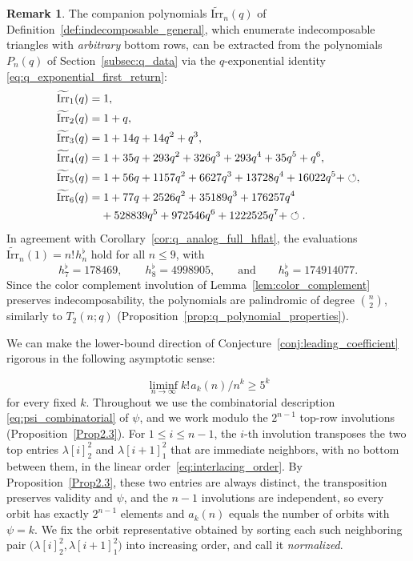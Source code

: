 \documentclass[10pt,a4paper]{amsart}
\numberwithin{equation}{section}
\newcommand{\ssp}{\hspace{1pt}}
\theoremstyle{definition}
\newtheorem{Remark}[Theorem]{Remark}
\begin{document}
\begin{Remark}
	The companion polynomials $\widetilde{\mathrm{Irr}}_n(q)$ of
	Definition~\ref{def:indecomposable_general}, which enumerate indecomposable
	triangles with \emph{arbitrary} bottom rows, can be extracted from the
	polynomials $P_n(q)$ of Section~\ref{subsec:q_data} via the $q$-exponential
	identity \eqref{eq:q_exponential_first_return}:
	\begin{align*}
		&\widetilde{\mathrm{Irr}}_1(q)=1,\\
		&\widetilde{\mathrm{Irr}}_2(q)=1+q,\\
		&\widetilde{\mathrm{Irr}}_3(q)=1+14q+14q^2+q^3,\\
		&\widetilde{\mathrm{Irr}}_4(q)=1+35q+293q^2+326q^3+293q^4
		+35q^5+q^6,\\
		&\widetilde{\mathrm{Irr}}_5(q)=1+56q+1157q^2+6627q^3+13728q^4
		+16022q^5+\circlearrowleft,\\
		&\widetilde{\mathrm{Irr}}_6(q)=1+77q+2526q^2+35189q^3+176257q^4\\
&\hphantom{\widetilde{\mathrm{Irr}}_6(q)=}{}
		+528839q^5+972546q^6+1222525q^7+\circlearrowleft.
	\end{align*}
	In agreement with Corollary~\ref{cor:q_analog_full_hflat}, the evaluations
	$\widetilde{\mathrm{Irr}}_n(1)=n!\ssp h^\flat_n$ hold for all
	$n\le 9$, with
\[
h^\flat_7=178469 , \qquad h^\flat_8=4998905 , \qquad \text{and}\qquad h^\flat_9=174914077.
\]
Since the color complement involution of Lemma~\ref{lem:color_complement} preserves
indecomposability, the polynomials
 are palindromic of degree
$\binom{n}{2}$, similarly to $T_2(n;q)$ (Proposition~\ref{prop:q_polynomial_properties}).
\end{Remark}

We can make the lower-bound direction of Conjecture~\ref{conj:leading_coefficient}
rigorous in the following asymptotic sense:{\samepage
\[
\liminf_{n\to\infty}k!\ssp a_k(n)/n^{k}\ge 5^{k}
\] for every fixed $k$.
Throughout we use the combinatorial description \eqref{eq:psi_combinatorial} of
$\psi$, and we work modulo the $2^{n-1}$ top-row involutions
(Proposition~\ref{Prop2.3}). For $1\le i\le n-1$, the $i$-th involution
transposes the two top entries $\lambda[i]^2_2$ and $\lambda[i+1]^2_1$ that are
immediate neighbors, with no bottom between them, in the linear order~\eqref{eq:interlacing_order}. By Proposition~\ref{Prop2.3}, these two
entries are always distinct, the transposition preserves validity and $\psi$,
and the $n-1$ involutions are independent, so every orbit has exactly $2^{n-1}$
elements and $a_k(n)$ equals the number of orbits with $\psi=k$. We fix the
orbit representative obtained by sorting each such neighboring pair
$\bigl(\lambda[i]^2_2,\lambda[i+1]^2_1\bigr)$ into increasing order, and call it
\emph{normalized}.

}
\end{document}
